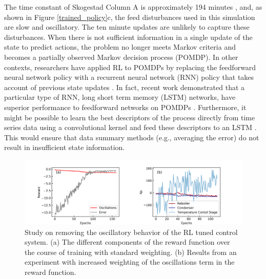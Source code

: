 The time constant of Skogestad Column A is approximately 194 minutes \cite{Skogestad1988}, and, as shown in Figure \ref{trained_policy}c, the feed disturbances used in this simulation are slow and oscillatory. The ten minute updates are unlikely to capture these disturbances. When there is not sufficient information in a single update of the state to predict actions, the problem no longer meets Markov criteria and becomes a partially observed Markov decision process (POMDP). In other contexts, researchers have applied RL to POMDPs by replacing the feedforward neural network policy with a recurrent neural network (RNN) policy that takes account of previous state updates \cite{Bakker2002, Hausknecht2015}. In fact, recent work demonstrated that a particular type of RNN, long short term memory (LSTM) networks, have superior performance to feedforward networks on POMDPs \cite{openai2018}. Furthermore, it might be possible to learn the best descriptors of the process directly from time series data using a convolutional kernel and feed these descriptors to an LSTM \cite{Hausknecht2015, Badgwell2019}. This would ensure that data summary methods (e.g., averaging the error) do not result in insufficient state information. 

\begin{figure}[t]
  \includegraphics[width=1.2\textwidth]{gfx/Chapter05/oscillations_study.png}
  \caption{Study on removing the oscillatory behavior of the RL tuned control system. (a) The different components of the reward function over the course of training with standard weighting. (b) Results from an experiment with increased weighting of the oscillations term in the reward function.}
  \label{reward_tradeoff}
\end{figure}

 
